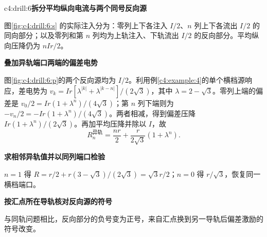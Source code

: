 \begin{drillsolution}{c4:drill:6}\textbf{拆分平均纵向电流与两个同号反向源}\par\nobreak
图\ref{fig:c4:drill:6:s} 的实际注入分为：零列上下各注入 $I/2$、$n$ 列上下各流出 $I/2$ 的同向部分；以及零列和第 $n$ 列均为上轨注入、下轨流出 $I/2$ 的反向部分。平均纵向压降仍为 $nIr/2$。



\par\medskip{}\noindent\textbf{叠加异轨端口两端的偏差电势}\par\nobreak
图\ref{fig:c4:drill:6:p}的两个反向源均为 $I/2$。利用例\ref{c4:example:4}的单个横档源响应，差电势为
$v_k=Ir[\lambda^{|k|}+\lambda^{|k-n|}]/(2\sqrt3)$，其中 $\lambda=2-\sqrt3$。零列上端的偏差是 $v_0/2=Ir(1+\lambda^n)/(4\sqrt3)$；第 $n$ 列下端则为 $-v_n/2=-Ir(1+\lambda^n)/(4\sqrt3)$。两者相减，得到偏差压降 $Ir(1+\lambda^n)/(2\sqrt3)$。再加平均压降并除以 $I$，故
\[
 R_n^{\text{异轨}}=\frac{nr}{2}+\frac{r}{2\sqrt3}(1+\lambda^n).
\]


\par\medskip{}\noindent\textbf{求相邻异轨值并以同列端口检验}\par\nobreak
$n=1$ 得 $R=r/2+r(3-\sqrt3)/(2\sqrt3)=\sqrt3r/2$；$n=0$ 得 $r/\sqrt3$，恢复同一横档端口。

\par\medskip{}\noindent\textbf{按汇点所在导轨核对反向源的符号}\par\nobreak
与同轨问题相比，反向部分的负号变为正号，来自汇点换到另一导轨后偏差激励的符号改变。\end{drillsolution}
